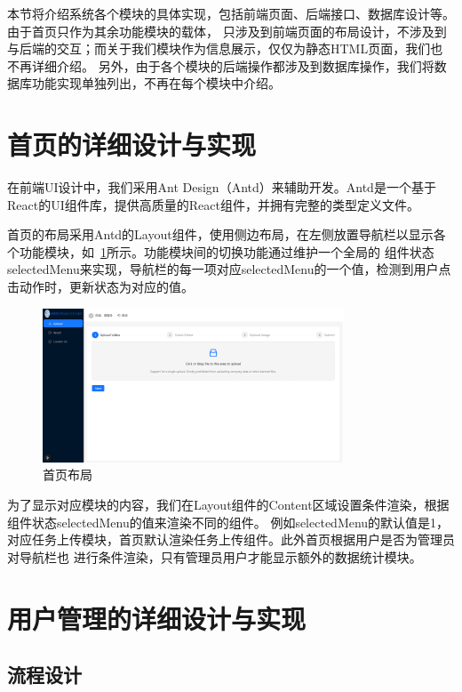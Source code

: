 本节将介绍系统各个模块的具体实现，包括前端页面、后端接口、数据库设计等。由于首页只作为其余功能模块的载体，
只涉及到前端页面的布局设计，不涉及到与后端的交互；而关于我们模块作为信息展示，仅仅为静态HTML页面，我们也不再详细介绍。
另外，由于各个模块的后端操作都涉及到数据库操作，我们将数据库功能实现单独列出，不再在每个模块中介绍。

\section{首页的详细设计与实现}

在前端UI设计中，我们采用Ant Design（Antd）来辅助开发。Antd是一个基于React的UI组件库，提供高质量的React组件，并拥有完整的类型定义文件。

首页的布局采用Antd的Layout组件，使用侧边布局，在左侧放置导航栏以显示各个功能模块，如~\ref{fig:app-dashboard}所示。功能模块间的切换功能通过维护一个全局的
组件状态selectedMenu来实现，导航栏的每一项对应selectedMenu的一个值，检测到用户点击动作时，更新状态为对应的值。

\begin{figure}[ht]
    \centering
    \includegraphics[width=0.8\textwidth]{source/img/app_dashboard.png}
    \caption{首页布局}
    \label{fig:app-dashboard}
\end{figure}

为了显示对应模块的内容，我们在Layout组件的Content区域设置条件渲染，根据组件状态selectedMenu的值来渲染不同的组件。
例如selectedMenu的默认值是1，对应任务上传模块，首页默认渲染任务上传组件。此外首页根据用户是否为管理员对导航栏也
进行条件渲染，只有管理员用户才能显示额外的数据统计模块。

\section{用户管理的详细设计与实现}

\subsection{流程设计}

